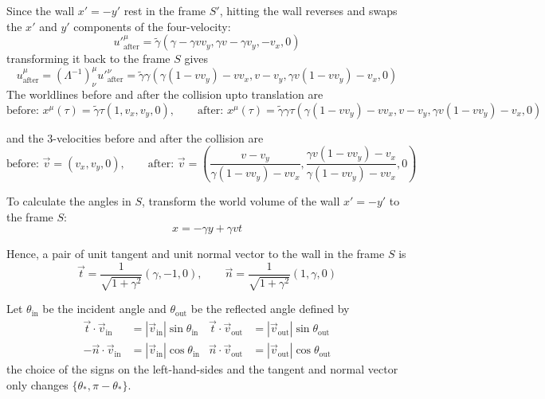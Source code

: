 \documentclass[a4paper,11pt]{article}
\begin{document}
Since the wall $x'=-y'$ rest in the frame $S'$, hitting the wall reverses and swaps the $x'$ and $y'$ components of the four-velocity:
\begin{equation}
    u'^\mu_{\text{after}} = \tilde{\gamma}(\gamma - \gamma vv_y, \gamma v - \gamma v_y, -v_x, 0)
\end{equation}
transforming it back to the frame $S$ gives
\begin{equation}
    u^\mu_{\text{after}} = (\Lambda^{-1})^\mu_\nu u'^\nu_{\text{after}} = \tilde{\gamma}\gamma(\gamma(1-vv_y) - vv_x, v - v_y, \gamma v(1-vv_y) - v_x, 0)
\end{equation}
The worldlines before and after the collision upto translation are
\begin{equation}
    \text{before: } x^\mu(\tau) = \tilde{\gamma}\tau(1, v_x, v_y, 0), \qquad
    \text{after: } x^\mu(\tau) = \tilde{\gamma}\gamma\tau(\gamma(1-vv_y) - vv_x, v - v_y, \gamma v(1-vv_y) - v_x, 0)
\end{equation}

and the 3-velocities before and after the collision are
\begin{equation}
    \text{before: } \vec{v} = (v_x, v_y, 0), \qquad
    \text{after: } \vec{v} = \left(\frac{v - v_y}{\gamma(1-vv_y) - vv_x}, \frac{\gamma v(1-vv_y)-v_x}{\gamma(1-vv_y) - vv_x}, 0\right)
\end{equation}


To calculate the angles in $S$, transform the world volume of the wall $x'=-y'$ to the frame $S$:
\begin{equation}
    x = -\gamma y + \gamma vt
\end{equation}

Hence, a pair of unit tangent and unit normal vector to the wall in the frame $S$ is
\begin{equation}
    \vec{t} = \frac{1}{\sqrt{1 + \gamma^2}}(\gamma, -1, 0), \qquad \vec{n} = \frac{1}{\sqrt{1 + \gamma^2}}(1, \gamma, 0)
\end{equation}

Let $\theta_{\mathrm{in}}$ be the incident angle and $\theta_{\mathrm{out}}$ be the reflected angle defined by
\begin{align}
    \vec{t}\cdot\vec{v}_{\mathrm{in}} &= |\vec{v}_{\mathrm{in}}|\sin\theta_{\mathrm{in}} &
    \vec{t}\cdot\vec{v}_{\mathrm{out}} &= |\vec{v}_{\mathrm{out}}|\sin\theta_{\mathrm{out}} \\
    -\vec{n}\cdot\vec{v}_{\mathrm{in}} &= |\vec{v}_{\mathrm{in}}|\cos\theta_{\mathrm{in}} &
    \vec{n}\cdot\vec{v}_{\mathrm{out}} &= |\vec{v}_{\mathrm{out}}|\cos\theta_{\mathrm{out}}
\end{align}
the choice of the signs on the left-hand-sides and the tangent and normal vector only changes $\{\theta_{*}, \pi-\theta_{*}\}$.
\end{document}

